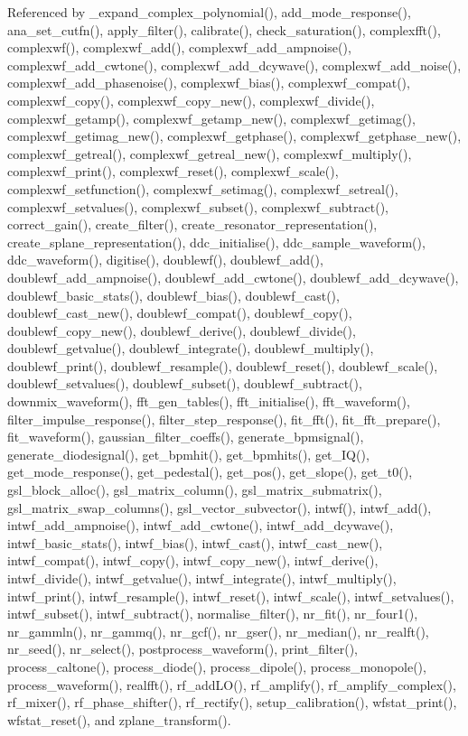 Referenced by \_\-expand\_\-complex\_\-polynomial(), add\_\-mode\_\-response(), ana\_\-set\_\-cutfn(), apply\_\-filter(), calibrate(), check\_\-saturation(), complexfft(), complexwf(), complexwf\_\-add(), complexwf\_\-add\_\-ampnoise(), complexwf\_\-add\_\-cwtone(), complexwf\_\-add\_\-dcywave(), complexwf\_\-add\_\-noise(), complexwf\_\-add\_\-phasenoise(), complexwf\_\-bias(), complexwf\_\-compat(), complexwf\_\-copy(), complexwf\_\-copy\_\-new(), complexwf\_\-divide(), complexwf\_\-getamp(), complexwf\_\-getamp\_\-new(), complexwf\_\-getimag(), complexwf\_\-getimag\_\-new(), complexwf\_\-getphase(), complexwf\_\-getphase\_\-new(), complexwf\_\-getreal(), complexwf\_\-getreal\_\-new(), complexwf\_\-multiply(), complexwf\_\-print(), complexwf\_\-reset(), complexwf\_\-scale(), complexwf\_\-setfunction(), complexwf\_\-setimag(), complexwf\_\-setreal(), complexwf\_\-setvalues(), complexwf\_\-subset(), complexwf\_\-subtract(), correct\_\-gain(), create\_\-filter(), create\_\-resonator\_\-representation(), create\_\-splane\_\-representation(), ddc\_\-initialise(), ddc\_\-sample\_\-waveform(), ddc\_\-waveform(), digitise(), doublewf(), doublewf\_\-add(), doublewf\_\-add\_\-ampnoise(), doublewf\_\-add\_\-cwtone(), doublewf\_\-add\_\-dcywave(), doublewf\_\-basic\_\-stats(), doublewf\_\-bias(), doublewf\_\-cast(), doublewf\_\-cast\_\-new(), doublewf\_\-compat(), doublewf\_\-copy(), doublewf\_\-copy\_\-new(), doublewf\_\-derive(), doublewf\_\-divide(), doublewf\_\-getvalue(), doublewf\_\-integrate(), doublewf\_\-multiply(), doublewf\_\-print(), doublewf\_\-resample(), doublewf\_\-reset(), doublewf\_\-scale(), doublewf\_\-setvalues(), doublewf\_\-subset(), doublewf\_\-subtract(), downmix\_\-waveform(), fft\_\-gen\_\-tables(), fft\_\-initialise(), fft\_\-waveform(), filter\_\-impulse\_\-response(), filter\_\-step\_\-response(), fit\_\-fft(), fit\_\-fft\_\-prepare(), fit\_\-waveform(), gaussian\_\-filter\_\-coeffs(), generate\_\-bpmsignal(), generate\_\-diodesignal(), get\_\-bpmhit(), get\_\-bpmhits(), get\_\-IQ(), get\_\-mode\_\-response(), get\_\-pedestal(), get\_\-pos(), get\_\-slope(), get\_\-t0(), gsl\_\-block\_\-alloc(), gsl\_\-matrix\_\-column(), gsl\_\-matrix\_\-submatrix(), gsl\_\-matrix\_\-swap\_\-columns(), gsl\_\-vector\_\-subvector(), intwf(), intwf\_\-add(), intwf\_\-add\_\-ampnoise(), intwf\_\-add\_\-cwtone(), intwf\_\-add\_\-dcywave(), intwf\_\-basic\_\-stats(), intwf\_\-bias(), intwf\_\-cast(), intwf\_\-cast\_\-new(), intwf\_\-compat(), intwf\_\-copy(), intwf\_\-copy\_\-new(), intwf\_\-derive(), intwf\_\-divide(), intwf\_\-getvalue(), intwf\_\-integrate(), intwf\_\-multiply(), intwf\_\-print(), intwf\_\-resample(), intwf\_\-reset(), intwf\_\-scale(), intwf\_\-setvalues(), intwf\_\-subset(), intwf\_\-subtract(), normalise\_\-filter(), nr\_\-fit(), nr\_\-four1(), nr\_\-gammln(), nr\_\-gammq(), nr\_\-gcf(), nr\_\-gser(), nr\_\-median(), nr\_\-realft(), nr\_\-seed(), nr\_\-select(), postprocess\_\-waveform(), print\_\-filter(), process\_\-caltone(), process\_\-diode(), process\_\-dipole(), process\_\-monopole(), process\_\-waveform(), realfft(), rf\_\-addLO(), rf\_\-amplify(), rf\_\-amplify\_\-complex(), rf\_\-mixer(), rf\_\-phase\_\-shifter(), rf\_\-rectify(), setup\_\-calibration(), wfstat\_\-print(), wfstat\_\-reset(), and zplane\_\-transform().
